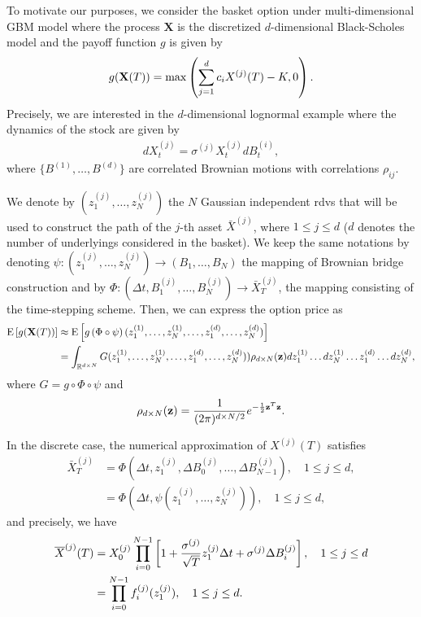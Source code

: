 To motivate our purposes, we consider the basket option under multi-dimensional GBM model where the process $\mathbf{X}$ is the discretized $d$-dimensional Black-Scholes model and the payoff function $g$ is given by
\begin{align}
	g(\mathbf{X}(T))=\max\left(\sum_{j=1}^{d} c_{i} X^{(j)}(T)-K,0  \right)	.
\end{align}
Precisely, we are interested in the  $d$-dimensional lognormal example where the dynamics of the stock are given by
\begin{align}\label{lognormal_dynamics_basket}
	dX^{(j)}_t=\sigma^{(j)} X^{(j)}_t dB^{(i)}_t,
\end{align}
where $\{B^{(1)}, \dots,B^{(d)}\}$ are correlated Brownian motions with correlations $\rho_{ij}$.


We denote by $(z_1^{(j)},\dots,z_N^{(j)})$ the $N$ Gaussian independent rdvs that will be used to construct the path of the $j$-th asset $\bar{X}^{(j)}$, where $1 \le j \le d$ ($d$ denotes the number of underlyings considered in the basket). We keep the  same notations by denoting  $\psi: (z_1^{(j)},\dots,z_N^{(j)}) \rightarrow (B_1,\dots,B_N)$ the mapping of Brownian bridge construction and by $\Phi: (\Delta t, B^{(j)}_1,\dots,B^{(j)}_N) \rightarrow \bar{X}^{(j)}_T$, the mapping consisting of the time-stepping scheme. Then, we can express the option price as
\begin{align}\label{eq: option price as integral_basket}
	\mathrm{E}\left[g(\mathbf{X}(T))\right]&\approx	\mathrm{E}\left[g\left(\Phi \circ \psi \right) (z_1^{(1)}, \dots, z_N^{(1)}, \dots, z_1^{(d)},\dots,z^{(d)}_N)\right] \nonumber\\
	&=\int_{\mathbb{R}^{d \times N}} G(z_1^{(1)}, \dots, z_N^{(1)}, \dots, z_1^{(d)},\dots,z^{(d)}_N)) \rho_{d \times N}(\mathbf{z}) dz_1^{(1)} \dots dz_N^{(1)} \dots z_1^{(d)} \dots dz^{(d)}_N ,
\end{align}
where $G=g \circ \Phi \circ \psi$ and
\begin{equation*}
\rho_{d \times N}(\mathbf{z})=\frac{1}{(2 \pi)^{{d \times N}/2}} e^{-\frac{1}{2} \mathbf{z}^T \mathbf{z}} .
\end{equation*}

In the discrete case, the numerical approximation of $X^{(j)}(T)$ satisfies
\begin{align}
	\bar{X}^{(j)}_T&=\Phi(\Delta t, z_1^{(j)}, \Delta B^{(j)}_0,\dots,\Delta B^{(j)}_{N-1}),  \quad 1 \le j \le d, \\ \nonumber
	&=\Phi(\Delta t, \psi(z_1^{(j)},\dots,z_N^{(j)})), \quad 1 \le j \le d,
\end{align}
and precisely, we have
\begin{align}\label{eq:discrete_rep}
	\overline{X}^{(j)}(T)&=X_0^{(j)} \prod_{i=0}^{N-1} \left[ 1+\frac{\sigma^{(j)}}{\sqrt{T}} z^{(j)}_1 \Delta t+ \sigma^{(j)} \Delta B^{(j)}_{i}\right], \quad 1 \le j \le d \nonumber\\
	&= \prod_{i=0}^{N-1} f_i^{(j)}(z^{(j)}_1) , \quad 1 \le j \le d .
\end{align}
